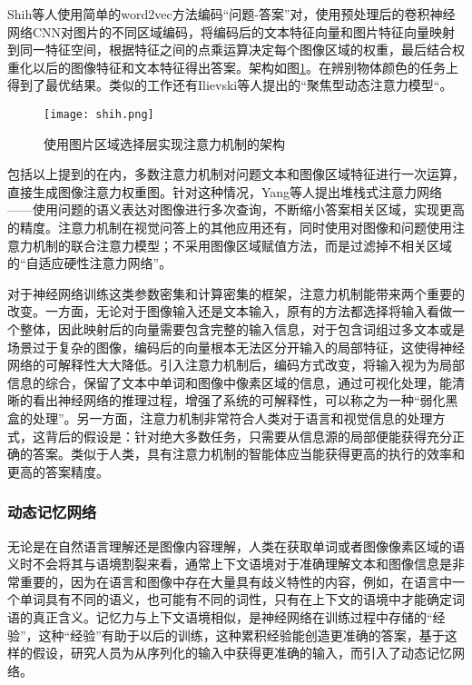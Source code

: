 Shih等人使用简单的word2vec方法编码“问题-答案”对，使用预处理后的卷积神经网络CNN对图片的不同区域编码，将编码后的文本特征向量和图片特征向量映射到同一特征空间，根据特征之间的点乘运算决定每个图像区域的权重，最后结合权重化以后的图像特征和文本特征得出答案。架构如图\ref{shih}。在辨别物体颜色的任务上得到了最优结果。类似的工作还有Ilievski等人提出的“聚焦型动态注意力模型“。
\begin{figure}[H]
	\centering
	\texttt{[image: shih.png]}
	\caption{使用图片区域选择层实现注意力机制的架构}
	\label{shih}
\end{figure}

包括以上提到的在内，多数注意力机制对问题文本和图像区域特征进行一次运算，直接生成图像注意力权重图。针对这种情况，Yang等人提出堆栈式注意力网络——使用问题的语义表达对图像进行多次查询，不断缩小答案相关区域，实现更高的精度。注意力机制在视觉问答上的其他应用还有，同时使用对图像和问题使用注意力机制的联合注意力模型；不采用图像区域赋值方法，而是过滤掉不相关区域的“自适应硬性注意力网络”。

对于神经网络训练这类参数密集和计算密集的框架，注意力机制能带来两个重要的改变。一方面，无论对于图像输入还是文本输入，原有的方法都选择将输入看做一个整体，因此映射后的向量需要包含完整的输入信息，对于包含词组过多文本或是场景过于复杂的图像，编码后的向量根本无法区分开输入的局部特征，这使得神经网络的可解释性大大降低。引入注意力机制后，编码方式改变，将输入视为为局部信息的综合，保留了文本中单词和图像中像素区域的信息，通过可视化处理，能清晰的看出神经网络的推理过程，增强了系统的可解释性，可以称之为一种“弱化黑盒的处理”。另一方面，注意力机制非常符合人类对于语言和视觉信息的处理方式，这背后的假设是：针对绝大多数任务，只需要从信息源的局部便能获得充分正确的答案。类似于人类，具有注意力机制的智能体应当能获得更高的执行的效率和更高的答案精度。

\subsubsection{动态记忆网络}
无论是在自然语言理解还是图像内容理解，人类在获取单词或者图像像素区域的语义时不会将其与语境割裂来看，通常上下文语境对于准确理解文本和图像信息是非常重要的，因为在语言和图像中存在大量具有歧义特性的内容，例如，在语言中一个单词具有不同的语义，也可能有不同的词性，只有在上下文的语境中才能确定词语的真正含义。记忆力与上下文语境相似，是神经网络在训练过程中存储的“经验”，这种“经验”有助于以后的训练，这种累积经验能创造更准确的答案，基于这样的假设，研究人员为从序列化的输入中获得更准确的输入，而引入了动态记忆网络。


